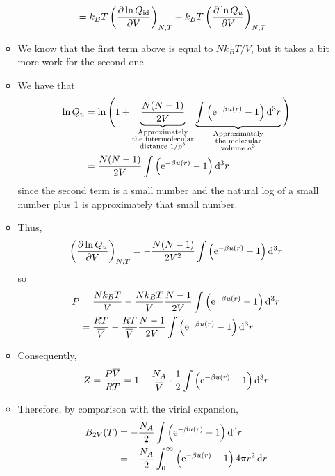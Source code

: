 \documentclass[../notes.tex]{subfiles}
\begin{document}
\begin{itemize}
\begin{itemize}
\begin{align*}
            &= k_BT\left( \pdv{\ln Q_\text{id}}{V} \right)_{N,T}+k_BT\left( \pdv{\ln Q_u}{V} \right)_{N,T}
        \end{align*}
        \item We know that the first term above is equal to $Nk_BT/V$, but it takes a bit more work for the second one.
        \item We have that
        \begin{align*}
            \ln Q_u &= \ln\Bigg( 1+\underbrace{\frac{N(N-1)}{2V}}_{\substack{\text{Approximately}\\\text{the intermolecular}\\\text{distance }1/\rho^3}}\underbrace{\int\left( \e[-\beta u(r)]-1 \right)\dd[3]{r}}_{\substack{\text{Approximately}\\\text{the molecular}\\\text{volume }a^3}} \Bigg)\\
            &= \frac{N(N-1)}{2V}\int\left( \e[-\beta u(r)]-1 \right)\dd[3]{r}
        \end{align*}
        since the second term is a small number and the natural log of a small number plus 1 is approximately that small number.
        \item Thus,
        \begin{equation*}
            \left( \pdv{\ln Q_u}{V} \right)_{N,T} = -\frac{N(N-1)}{2V^2}\int\left( \e[-\beta u(r)]-1 \right)\dd[3]{r}
        \end{equation*}
        so
        \begin{align*}
            P &= \frac{Nk_BT}{V}-\frac{Nk_BT}{V}\frac{N-1}{2V}\int\left( \e[-\beta u(r)]-1 \right)\dd[3]{r}\\
            &= \frac{RT}{\overline{V}}-\frac{RT}{\overline{V}}\frac{N-1}{2V}\int\left( \e[-\beta u(r)]-1 \right)\dd[3]{r}
        \end{align*}
        \item Consequently,
        \begin{equation*}
            Z = \frac{P\overline{V}}{RT} = 1-\frac{N_A}{\overline{V}}\cdot\frac{1}{2}\int\left( \e[-\beta u(r)]-1 \right)\dd[3]{r}
        \end{equation*}
        \item Therefore, by comparison with the virial expansion,
        \begin{align*}
            B_{2V}(T) &= -\frac{N_A}{2}\int\left( \e[-\beta u(r)]-1 \right)\dd[3]{r}\\
            &= -\frac{N_A}{2}\int_0^\infty\left( \e[-\beta u(r)]-1 \right)4\pi r^2\dd{r}\\

\end{align*}
\end{itemize}
\end{itemize}
\end{document}
